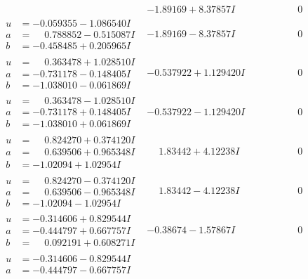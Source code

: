 \documentclass[1p]{elsarticle_modified}
\theoremstyle{definition}
\begin{document}
$$\begin{array}{c|c|c}
 & -1.89169 + 8.37857 I & \phantom{-0.000000 } 0 \\ \hline\begin{aligned}
u &= -0.059355 - 1.086540 I \\
a &= \phantom{-}0.788852 - 0.515087 I \\
b &= -0.458485 + 0.205965 I\end{aligned}
 & -1.89169 - 8.37857 I & \phantom{-0.000000 } 0 \\ \hline\begin{aligned}
u &= \phantom{-}0.363478 + 1.028510 I \\
a &= -0.731178 - 0.148405 I \\
b &= -1.038010 - 0.061869 I\end{aligned}
 & -0.537922 + 1.129420 I & \phantom{-0.000000 } 0 \\ \hline\begin{aligned}
u &= \phantom{-}0.363478 - 1.028510 I \\
a &= -0.731178 + 0.148405 I \\
b &= -1.038010 + 0.061869 I\end{aligned}
 & -0.537922 - 1.129420 I & \phantom{-0.000000 } 0 \\ \hline\begin{aligned}
u &= \phantom{-}0.824270 + 0.374120 I \\
a &= \phantom{-}0.639506 + 0.965348 I \\
b &= -1.02094 + 1.02954 I\end{aligned}
 & \phantom{-}1.83442 + 4.12238 I & \phantom{-0.000000 } 0 \\ \hline\begin{aligned}
u &= \phantom{-}0.824270 - 0.374120 I \\
a &= \phantom{-}0.639506 - 0.965348 I \\
b &= -1.02094 - 1.02954 I\end{aligned}
 & \phantom{-}1.83442 - 4.12238 I & \phantom{-0.000000 } 0 \\ \hline\begin{aligned}
u &= -0.314606 + 0.829544 I \\
a &= -0.444797 + 0.667757 I \\
b &= \phantom{-}0.092191 + 0.608271 I\end{aligned}
 & -0.38674 - 1.57867 I & \phantom{-0.000000 } 0 \\ \hline\begin{aligned}
u &= -0.314606 - 0.829544 I \\
a &= -0.444797 - 0.667757 I \\

\end{aligned}
\end{array}$$
\end{document}
